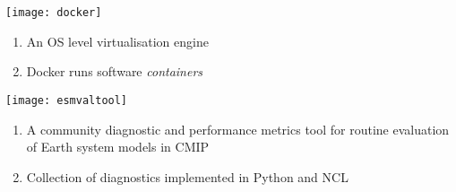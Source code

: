 \documentclass[portrait,a0paper,fontscale=0.35]{baposter} %
\newcommand{\compresslist}{%
\setlength{\itemsep}{1pt}%
\setlength{\parskip}{0pt}%
\setlength{\parsep}{0pt}%
}
\begin{document}
\begin{poster}
{\begin{multicols}{2}
    \texttt{[image: docker]}
    \begin{enumerate}\compresslist
      \item An OS level virtualisation engine
      \item Docker runs software \textit{containers}
    \end{enumerate}

    \texttt{[image: esmvaltool]}
    \begin{enumerate}\compresslist
      \item A community diagnostic and performance metrics tool for routine evaluation of Earth system models in CMIP
      \item Collection of diagnostics implemented in Python and NCL
    \end{enumerate}
  \end{multicols}
}






\end{poster}
\end{document}

